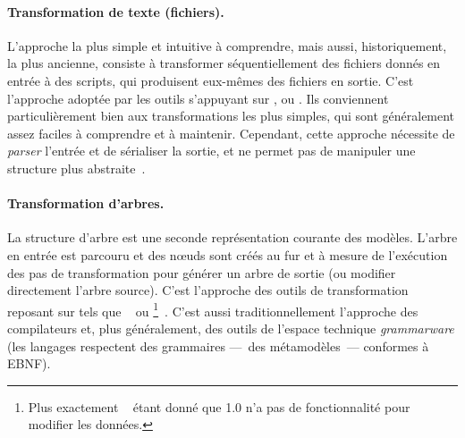 \paragraph{Transformation de texte (fichiers).} 
L'approche la plus simple et intuitive à comprendre, mais aussi, historiquement,
la plus ancienne, consiste à transformer séquentiellement des fichiers donnés
en entrée à des scripts, qui produisent eux-mêmes des fichiers en sortie. C'est
l'approche adoptée par les outils s'appuyant sur {\awk}, {\sed} ou {\perl}. Ils 
conviennent particulièrement bien aux transformations les plus simples, qui sont
généralement assez faciles à comprendre et à maintenir. Cependant, cette
approche nécessite de \emph{parser} l'entrée et de sérialiser la sortie, et ne
permet pas de manipuler une structure plus abstraite~\cite{Gerber2002}. %

\paragraph{Transformation d'arbres.}
La structure d'arbre est une seconde représentation courante des modèles.
L'arbre en entrée est parcouru et des nœuds sont créés au fur et à mesure de
l'exécution des pas de transformation pour générer un arbre de sortie (ou
modifier directement l'arbre source). C'est l'approche des outils de
transformation reposant sur {\xml} tels que {\xslt}~\cite{xslt} ou
{\xquery}\footnote{Plus exactement {\xqueryuf}~\cite{xqueryuf} étant donné que
{\xquery} 1.0 n'a pas de fonctionnalité pour modifier les
données.}~\cite{xquery,xqueryuf}. C'est aussi traditionnellement l'approche des
compilateurs et, plus généralement, des outils de l'espace technique
\emph{grammarware} (les langages respectent des grammaires ---~des
métamodèles~--- conformes à EBNF).

